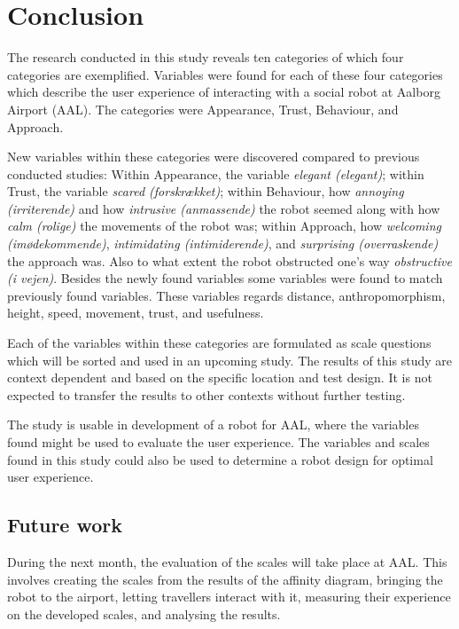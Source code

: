 \section{Conclusion}
\label{Conclusion}
%
The research conducted in this study reveals ten categories of which four categories are exemplified. Variables were found for each of these four categories which describe the user experience of interacting with a social robot at Aalborg Airport (AAL). The categories were Appearance, Trust, Behaviour, and Approach.

New variables within these categories were discovered compared to previous conducted studies: Within Appearance, the variable \textit{elegant (elegant)}; within Trust, the variable \textit{scared (forskrækket)}; within Behaviour, how \textit{annoying (irriterende)} and how \textit{intrusive (anmassende)} the robot seemed along with how \textit{calm (rolige)} the movements of the robot was; within Approach, how \textit{welcoming (imødekommende)}, \textit{intimidating (intimiderende)}, and \textit{surprising (overraskende)} the approach was. Also to what extent the robot obstructed one's way \textit{obstructive (i vejen)}. Besides the newly found variables some variables were found to match previously found variables. These variables regards distance, anthropomorphism, height, speed, movement, trust, and usefulness.

Each of the variables within these categories are formulated as scale questions which will be sorted and used in an upcoming study. The results of this study are context dependent and based on the specific location and test design. It is not expected to transfer the results to other contexts without further testing. 

The study is usable in development of a robot for AAL, where the variables found might be used to evaluate the user experience. The variables and scales found in this study could also be used to determine a robot design for optimal user experience.

\subsection{Future work}
During the next month, the evaluation of the scales will take place at AAL. This involves creating the scales from the results of the affinity diagram, bringing the robot to the airport, letting travellers interact with it, measuring their experience on the developed scales, and analysing the results.

